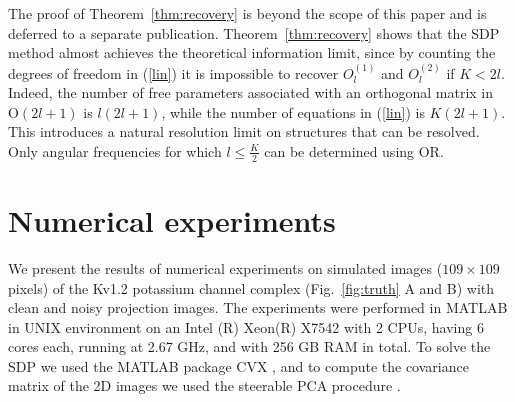 \documentclass{article}
\begin{document}
The proof of Theorem~\ref{thm:recovery} is beyond the scope of this paper and is deferred to a separate publication. Theorem~\ref{thm:recovery} shows that the SDP method almost achieves the theoretical information limit, since by counting the degrees of freedom in (\ref{lin}) it is impossible to recover $O_l^{(1)}$ and $O_l^{(2)}$ if $K< 2l$. Indeed, the number of free parameters associated with an orthogonal matrix in
$\text{O}(2l+1)$ is $l(2l+1)$, while the number of equations in (\ref{lin}) is $K(2l+1)$. This introduces a natural resolution limit on structures that can be resolved. Only angular frequencies for which $l \leq \frac{K}{2}$ can be determined using OR.

\section{Numerical experiments}
We present the results of numerical experiments on simulated images ($109\times 109$ pixels) of the Kv1.2 potassium
channel complex (Fig.~\ref{fig:truth} A and B) with clean and noisy
projection images. The experiments were performed in MATLAB in UNIX environment on an
Intel (R) Xeon(R) X7542 with 2 CPUs, having 6 cores each, running at 2.67 GHz, and with
256 GB RAM in total. To solve the SDP we used the MATLAB package CVX \cite{cvx}, and to compute the covariance matrix of the 2D images we used the steerable PCA procedure \cite{Zhao1}.
\end{document}
